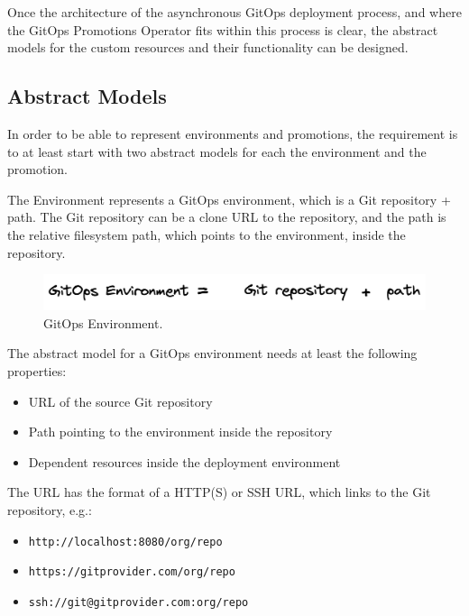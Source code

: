 Once the architecture of the asynchronous GitOps deployment process,
and where the GitOps Promotions Operator fits within this process is clear,
the abstract models for the custom resources and their functionality can be designed.

\subsection{Abstract Models}
	
In order to be able to represent environments and promotions,
the requirement is to at least start with two abstract models for each 
the environment and the promotion.

The Environment represents a GitOps environment,
which is a Git repository + path.
The Git repository can be a clone URL to the repository,
and the path is the relative filesystem path, which points to the 
environment, inside the repository.

\begin{figure}[h]
	\centering
	\includegraphics[width=1.00\linewidth]{assets/gitops-env-repo-and-path.png}
	\caption{GitOps Environment.
	}
	\label{fig:gitops-env-repo-and-path}	
\end{figure}

The abstract model for a GitOps environment needs at least the following properties:

\begin{itemize}
	\item URL of the source Git repository
	\item Path pointing to the environment inside the repository
	\item Dependent resources inside the deployment environment
\end{itemize}

The URL has the format of a HTTP(S) or SSH URL,
which links to the Git repository,
e.g.:

\begin{itemize}
	\item \lstinline|http://localhost:8080/org/repo|
	\item \lstinline|https://gitprovider.com/org/repo|
	\item \lstinline|ssh://git@gitprovider.com:org/repo|
\end{itemize}

